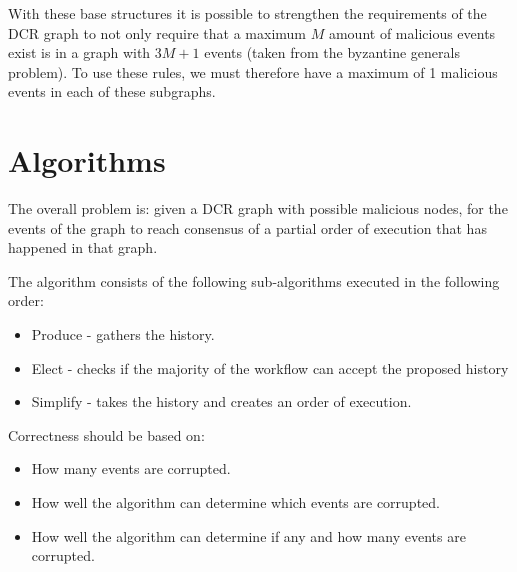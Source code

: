 \newpar With these base structures it is possible to strengthen the requirements of the DCR graph to not only require that a maximum $M$ amount of malicious events exist is in a graph with $3M+1$ events (taken from the byzantine generals problem). To use these rules, we must therefore have a maximum of 1 malicious events in each of these subgraphs.

\chapter{Algorithms}
The overall problem is: given a DCR graph with possible malicious nodes, for the events of the graph to reach consensus of a partial order of execution that has happened in that graph.

The algorithm consists of the following sub-algorithms executed in the following order:
\begin{itemize}
    \item Produce - gathers the history.
    \item Elect - checks if the majority of the workflow can accept the proposed history
    \item Simplify - takes the history and creates an order of execution.
\end{itemize}

\newpar Correctness should be based on:
\begin{itemize}
    \item How many events are corrupted.
    \item How well the algorithm can determine which events are corrupted.
    \item How well the algorithm can determine if any and how many events are corrupted.
\end{itemize}









